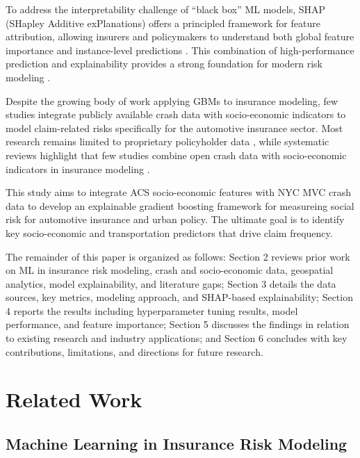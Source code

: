 \documentclass[
  number,
  review,
  3p]{elsarticle}
\begin{document}
To address the interpretability challenge of ``black box'' ML models,
SHAP (SHapley Additive exPlanations) offers a principled framework for
feature attribution, allowing insurers and policymakers to understand
both global feature importance and instance-level predictions
\citep{lundberg, dong, ning}. This combination of high-performance
prediction and explainability provides a strong foundation for modern
risk modeling \citep{kim}.

Despite the growing body of work applying GBMs to insurance modeling,
few studies integrate publicly available crash data with socio-economic
indicators to model claim-related risks specifically for the automotive
insurance sector. Most research remains limited to proprietary
policyholder data \citep{henckaerts, mohamed}, while systematic reviews
highlight that few studies combine open crash data with socio-economic
indicators in insurance modeling \citep{ali, behboudi}.

This study aims to integrate ACS socio-economic features with NYC MVC
crash data to develop an explainable gradient boosting framework for
measureing social risk for automotive insurance and urban policy. The
ultimate goal is to identify key socio-economic and transportation
predictors that drive claim frequency.

The remainder of this paper is organized as follows: Section 2 reviews
prior work on ML in insurance risk modeling, crash and socio-economic
data, geospatial analytics, model explainability, and literature gaps;
Section 3 details the data sources, key metrics, modeling approach, and
SHAP-based explainability; Section 4 reports the results including
hyperparameter tuning results, model performance, and feature
importance; Section 5 discusses the findings in relation to existing
research and industry applications; and Section 6 concludes with key
contributions, limitations, and directions for future research.

\section{Related Work}\label{related-work}

\subsection{\texorpdfstring{\textbf{Machine Learning in Insurance Risk
Modeling}}{Machine Learning in Insurance Risk Modeling}}\label{machine-learning-in-insurance-risk-modeling}
\end{document}
